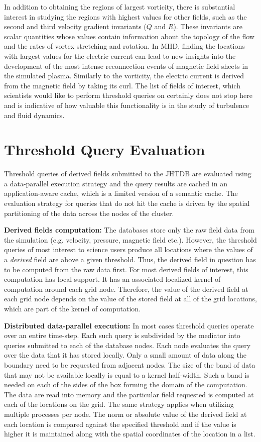 \documentclass{sig-alternate}
\begin{document}
In addition to obtaining the regions of largest vorticity, there is substantial interest in studying the regions with highest values for other fields, such as
the second and third velocity gradient invariants ($Q$ and $R$). These invariants are scalar quantities whose values contain information about the 
topology of the flow and the rates of vortex stretching and rotation. In MHD, finding the locations with largest values for the electric current
can lead to new insights into the development of the most intense reconnection events of magnetic field sheets in the simulated plasma. Similarly to
the vorticity, the electric current is derived from the magnetic field by taking its curl. The list of fields of interest, which scientists would like to perform 
threshold queries on certainly does not stop here and is indicative of how valuable this functionality is in the study of turbulence and fluid dynamics.

\section{Threshold Query Evaluation}

Threshold queries of derived fields submitted to the JHTDB are evaluated using a data-parallel execution strategy and the query results are 
cached in an application-aware cache, which is a limited version of a semantic cache. 
The evaluation strategy for queries that do not hit the cache is driven by the spatial partitioning of the data across the nodes of the cluster.

{\bf Derived fields computation:} The databases store only the raw field data from the simulation (e.g. velocity, pressure, magnetic field etc.). However,
the threshold queries of most interest to science users produce all locations where the values of a \emph{derived} field are above a given threshold. Thus, the
derived field in question has to be computed from the raw data first. For most derived fields of interest, this computation has local support. It has an 
associated localized kernel of computation around each grid node. Therefore, the value of the derived field at each grid node depends on the value of the
stored field at all of the grid locations, which are part of the kernel of computation. 

{\bf Distributed data-parallel execution:} In most cases threshold queries operate over an entire time-step. Each such query is subdivided by 
the mediator into queries submitted to
each of the database nodes. Each node evaluates the query over the data that it has stored locally. Only a small amount of data along the boundary
need to be requested from adjacent nodes. The size of the band of data that may not be available locally is equal to a kernel half-width. 
Such a band is needed on each of the sides of the box forming the domain of the computation.  
The data are read into memory and the particular field requested is computed at each of the locations on
the grid. The same strategy applies when utilizing multiple processes per node. The norm or absolute value of the derived field at each location is compared 
against the specified threshold and if the value is higher it is maintained along with
the spatial coordinates of the location in a list.
\end{document}
